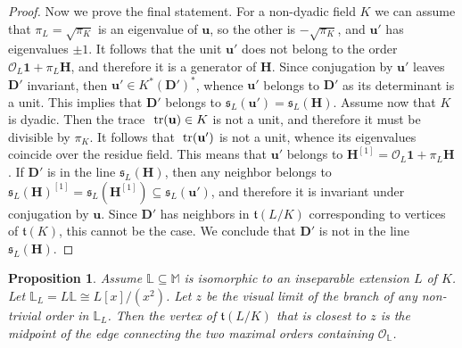 \documentclass{amsart}
\newtheorem{proposition}[theorem]{Proposition}
\theoremstyle{definition}
\newcommand\lu{\mathbb{L}}
\newcommand\alge{\mathbb{M}}
\newcommand\tr{\textnormal{ tr}}
\newcommand\oink{\mathcal O}
\newcommand\Da{\mathbf{D}}
\newcommand\Ha{\mathbf{H}}
\begin{document}
\begin{proof}
    Now we prove the final statement. For a non-dyadic field $K$
    we can assume that $\pi_L=\sqrt{\pi_K}$ is an eigenvalue
    of $\mathbf{u}$, so the other is $-\sqrt{\pi_K}$, and 
    $\mathbf{u}'$ has eigenvalues $\pm1$. It follows that 
    the unit $\mathbf{u}'$ does not belong to the order
    $\mathcal{O}_L\mathbf{1}+
    \pi_L\Ha$, and therefore it is a generator of $\Ha$.
    Since conjugation by $\mathbf{u}'$ leaves $\Da'$
    invariant, then $\mathbf{u}'\in K^*(\Da')^*$, whence
    $\mathbf{u}'$ belongs to $\Da'$ as its determinant is a 
    unit. This implies that $\Da'$ belongs to
    $\mathfrak{s}_L(\mathbf{u}')=\mathfrak{s}_L(\Ha)$.
    Assume now that $K$ is dyadic. Then the trace 
    $\tr(\mathbf{u})\in K$ is not a unit, and therefore
    it must be divisible by $\pi_K$. It follows that
    $\tr(\mathbf{u}')$ is not a unit, whence
    its eigenvalues coincide over the residue field.
    This means that $\mathbf{u}'$ belongs to 
    $\Ha^{[1]}=\mathcal{O}_L\mathbf{1}+\pi_L\Ha$.
    If $\Da'$ is in the line $\mathfrak{s}_L(\Ha)$,
    then any neighbor belongs to $\mathfrak{s}_L(\Ha)^{[1]}
    =\mathfrak{s}_L\left(\Ha^{[1]}\right)\subseteq
    \mathfrak{s}_L(\mathbf{u}')$, and therefore
    it is invariant under conjugation by $\mathbf{u}$.
    Since $\Da'$ has neighbors in 
    $\mathfrak{t}(L/K)$ corresponding
    to vertices of $\mathfrak{t}(K)$,
    this cannot be the case. We conclude that 
    $\Da'$ is not in the line $\mathfrak{s}_L(\Ha)$.
\end{proof}

\begin{proposition}\label{p27}
    Assume $\lu\subseteq\alge $
    is isomorphic to an
    inseparable extension $L$ of $K$.
    Let $\lu_L=L\lu\cong L[x]/(x^2)$.
    Let $z$ be the visual limit of the branch of
    any non-trivial order in $\lu_L$. 
    Then the vertex of $\mathfrak{t}(L/K)$
    that is closest to $z$ is the midpoint of the edge
     connecting the two maximal orders containing 
    $\oink_{\lu}$. 
\end{proposition}
\end{document}
